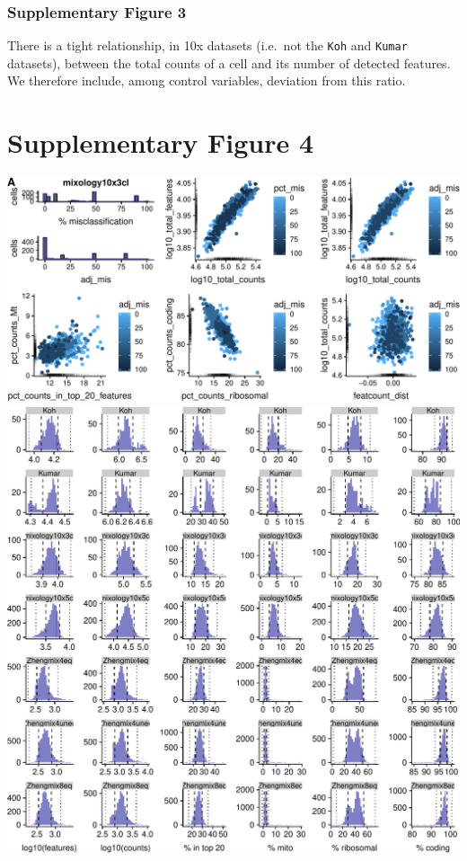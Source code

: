\documentclass[]{article}
\begin{document}
\vfill

\hypertarget{supplementary-figure-3-1}{%
\subsubsection{Supplementary Figure 3}\label{supplementary-figure-3-1}}

There is a tight relationship, in 10x datasets (i.e.~not the
\texttt{Koh} and \texttt{Kumar} datasets), between the total counts of a
cell and its number of detected features. We therefore include, among
control variables, deviation from this ratio.

\newpage

\hypertarget{supplementary-figure-4}{%
\section{Supplementary Figure 4}\label{supplementary-figure-4}}

\includegraphics{supp_figures_files/figure-latex/misclass-1.pdf}
\vspace{1cm}
\includegraphics{supp_figures_files/figure-latex/unnamed-chunk-4-1.pdf}
\end{document}
